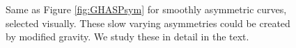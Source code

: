 \documentclass[useAMS,usenatbib,twocolumn]{mn2e}
\begin{document}
\begin{figure}
\caption{Same as Figure \ref{fig:GHASPsym} for smoothly asymmetric curves, 
selected visually. These slow varying asymmetries could be created by modified
gravity. We study these in detail in the text.
\label{fig:GHASPasym}}
\end{figure}
\end{document}
